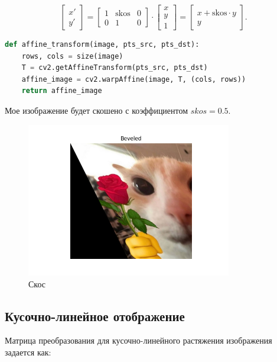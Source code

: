 \documentclass[a4paper,12pt]{article}
\begin{document}
\[
\begin{bmatrix} x' \\ y' \end{bmatrix} = 
\begin{bmatrix} 
1 & \text{skos} & 0 \\ 
0 & 1 & 0 
\end{bmatrix} 
\cdot 
\begin{bmatrix} x \\ y \\ 1 \end{bmatrix} 
= 
\begin{bmatrix} 
x + \text{skos} \cdot y \\ 
y 
\end{bmatrix}.
\]
\begin{lstlisting}[language=Python, caption=Функция скоса]
def affine_transform(image, pts_src, pts_dst):
    rows, cols = size(image)
    T = cv2.getAffineTransform(pts_src, pts_dst)
    affine_image = cv2.warpAffine(image, T, (cols, rows))
    return affine_image
\end{lstlisting}

Мое изображение будет скошено с коэффициентом \( skos = 0.5 \).

\begin{figure}[H]
    \centering
    \includegraphics[width=0.8\textwidth]{lab2/task1/Figure_8.png}
    \caption{Скос}
    \label{fig:my_image}
\end{figure}

\subsection{Кусочно-линейное отображение}

Матрица преобразования для кусочно-линейного растяжения изображения задается как:
\end{document}
